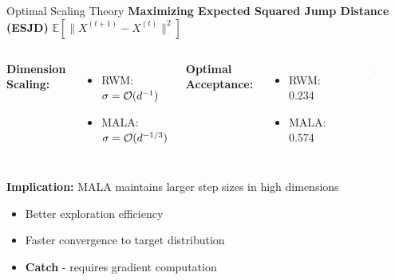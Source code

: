 \begin{frame}{Optimal Scaling Theory}
		\textbf{Maximizing Expected Squared Jump Distance (ESJD)}
		$\mathbb{E}\left[\|X^{(t+1)} - X^{(t)}\|^2\right]$

	\begin{columns}
		\textbf{Dimension Scaling:}
		\begin{itemize}
			\item RWM: $\sigma = \mathcal{O}(d^{-1})$
			\item \textcolor{copenhagenred}{MALA: $\sigma = \mathcal{O}(d^{-1/3})$}
		\end{itemize}

		\vspace{0.5em}

		\textbf{Optimal Acceptance:}
		\begin{itemize}
			\item RWM: 0.234
			\item \textcolor{copenhagenred}{MALA: 0.574}
		\end{itemize}
		\begin{figure}
			\centering
			\includegraphics[width=0.6\textwidth]{barker.jpg}
		\end{figure}
	\end{columns}


	\vspace{1em}

	\textbf{Implication:} MALA maintains larger step sizes in high dimensions
	\begin{itemize}
		\item Better exploration efficiency
		\item Faster convergence to target distribution
		\item \textbf{Catch} - requires gradient computation
	\end{itemize}
\end{frame}

